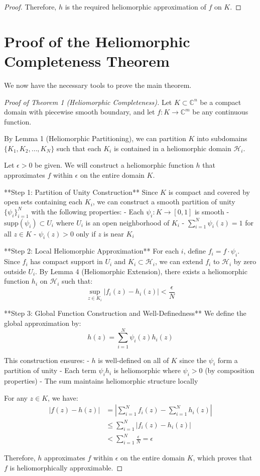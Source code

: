 \begin{proof}
Therefore, $h$ is the required heliomorphic approximation of $f$ on $K$.
\end{proof}

\section{Proof of the Heliomorphic Completeness Theorem}

We now have the necessary tools to prove the main theorem.

\begin{proof}[Proof of Theorem 1 (Heliomorphic Completeness)]
Let $K \subset \mathbb{C}^n$ be a compact domain with piecewise smooth boundary, and let $f: K \rightarrow \mathbb{C}^m$ be any continuous function.

By Lemma 1 (Heliomorphic Partitioning), we can partition $K$ into subdomains $\{K_1, K_2, \ldots, K_N\}$ such that each $K_i$ is contained in a heliomorphic domain $\mathcal{H}_i$.

Let $\epsilon > 0$ be given. We will construct a heliomorphic function $h$ that approximates $f$ within $\epsilon$ on the entire domain $K$.

**Step 1: Partition of Unity Construction**
Since $K$ is compact and covered by open sets containing each $K_i$, we can construct a smooth partition of unity $\{\psi_i\}_{i=1}^{N}$ with the following properties:
- Each $\psi_i: K \rightarrow [0,1]$ is smooth
- $\text{supp}(\psi_i) \subset U_i$ where $U_i$ is an open neighborhood of $K_i$
- $\sum_{i=1}^{N} \psi_i(z) = 1$ for all $z \in K$
- $\psi_i(z) > 0$ only if $z$ is near $K_i$

**Step 2: Local Heliomorphic Approximation**
For each $i$, define $f_i = f \cdot \psi_i$. Since $f_i$ has compact support in $U_i$ and $K_i \subset \mathcal{H}_i$, we can extend $f_i$ to $\mathcal{H}_i$ by zero outside $U_i$. By Lemma 4 (Heliomorphic Extension), there exists a heliomorphic function $h_i$ on $\mathcal{H}_i$ such that:
\begin{equation}
\sup_{z \in K_i} |f_i(z) - h_i(z)| < \frac{\epsilon}{N}
\end{equation}

**Step 3: Global Function Construction and Well-Definedness**
We define the global approximation by:
$$h(z) = \sum_{i=1}^{N} \psi_i(z) h_i(z)$$

This construction ensures:
- $h$ is well-defined on all of $K$ since the $\psi_i$ form a partition of unity
- Each term $\psi_i h_i$ is heliomorphic where $\psi_i > 0$ (by composition properties)
- The sum maintains heliomorphic structure locally

For any $z \in K$, we have:
\begin{align}
|f(z) - h(z)| &= \left|\sum_{i=1}^{N} f_i(z) - \sum_{i=1}^{N} h_i(z)\right|\\
&\leq \sum_{i=1}^{N} |f_i(z) - h_i(z)|\\
&< \sum_{i=1}^{N} \frac{\epsilon}{N} = \epsilon
\end{align}

Therefore, $h$ approximates $f$ within $\epsilon$ on the entire domain $K$, which proves that $f$ is heliomorphically approximable.
\end{proof}

